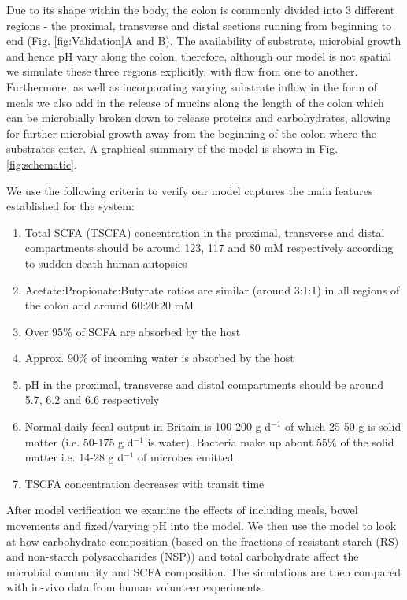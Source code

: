 \documentclass[a4paper]{article}
\begin{document}
Due to its shape within the body, the colon is commonly divided into 3 different regions - the proximal, transverse and distal sections running from beginning to end (Fig. \ref{fig:Validation}A and B). 
The availability of substrate, microbial growth and hence pH vary along the colon, therefore, although our model is not spatial we simulate these three regions explicitly, with flow from one to another.
Furthermore, as well as incorporating varying substrate inflow in the form of meals we also add in the release of mucins along the length of the colon which can be microbially broken down to release proteins and carbohydrates, allowing for further microbial growth away from the beginning of the colon where the substrates enter.
A graphical summary of the model is shown in Fig. \ref{fig:schematic}. 

We use the following criteria to verify our model captures the main features established for the system:
\begin{enumerate}
\item Total SCFA (TSCFA) concentration in the proximal, transverse and distal compartments should be around 123, 117 and 80 mM respectively according to sudden death human autopsies \citep{cummings} 
\item Acetate:Propionate:Butyrate ratios are similar (around 3:1:1) in all regions of the colon and around 60:20:20 mM \citep{cummings}
\item Over 95\% of SCFA are absorbed by the host \citep{Topping}
\item Approx. 90\% of incoming water is absorbed by the host \citep{Phillips} 
\item pH in the proximal, transverse and distal compartments should be around 5.7, 6.2 and 6.6 respectively \citep{cummings} 
\item Normal daily fecal output in Britain is 100-200 g d$^{-1}$ of which 25-50 g is solid matter (i.e. 50-175 g d$^{-1}$ is water). Bacteria make up about 55\% of the solid matter i.e. 14-28 g d$^{-1}$ of microbes emitted \citep{StephenCummings}.
\item TSCFA concentration decreases with transit time \citep{Lewis}
\end{enumerate}
After model verification we examine the effects of including meals, bowel movements and fixed/varying pH into the model. We then use the model to look at how carbohydrate composition (based on the fractions of resistant starch (RS) and non-starch polysaccharides (NSP)) and total carbohydrate affect the microbial community and SCFA composition. The simulations are then compared with in-vivo data from human volunteer experiments. 
\end{document}
